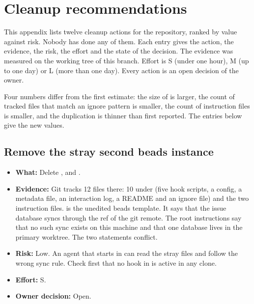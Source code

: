 \appendix

\chapter{Cleanup recommendations}\label{um:guide:cleanup-recommendations}

This appendix lists twelve cleanup actions for the repository, ranked by value against risk. Nobody has done any of them. Each entry gives the action, the evidence, the risk, the effort and the state of the decision. The evidence was measured on the working tree of this branch. Effort is S (under one hour), M (up to one day) or L (more than one day). Every action is an open decision of the owner.

Four numbers differ from the first estimate: the size of  is larger, the count of tracked files that match an ignore pattern is smaller, the count of instruction files is smaller, and the  duplication is thinner than first reported. The entries below give the new values.

\section{Remove the stray second beads instance}\label{um:guide:cleanup-recommendations:stray-beads}

\begin{itemize}
\item \textbf{What:} Delete ,  and .
\item \textbf{Evidence:} Git tracks 12 files there: 10 under  (five hook scripts, a config, a metadata file, an interaction log, a README and an ignore file) and the two instruction files.  is the unedited beads template. It says that the issue database syncs through the  ref of the git remote. The root instructions say that no such sync exists on this machine and that one database lives in the primary worktree. The two statements conflict.
\item \textbf{Risk:} Low. An agent that starts in  can read the stray files and follow the wrong sync rule. Check first that no hook in  is active in any clone.
\item \textbf{Effort:} S.
\item \textbf{Owner decision:} Open.
\end{itemize}

